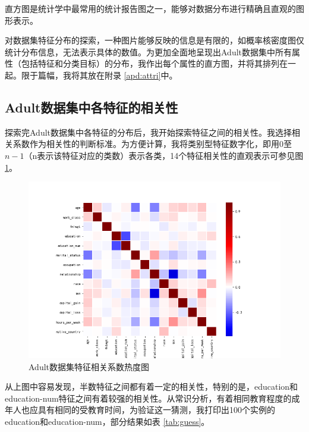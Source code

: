 \documentclass[12pt,a4paper]{article}
\theoremstyle{definition}
\begin{document}
直方图是统计学中最常用的统计报告图之一，能够对数据分布进行精确且直观的图形表示。

\vspace{0.01\linewidth}
对数据集特征分布的探索，一种图片能够反映的信息是有限的，如概率核密度图仅统计分布信息，无法表示具体的数值。为更加全面地呈现出Adult数据集中所有属性（包括特征和分类目标）的分布，我作出每个属性的直方图，并将其排列在一起。限于篇幅，我将其放在附录 \ref{apd:attri}中。

\subsection{Adult数据集中各特征的相关性}
\label{sec:cof}

探索完Adult数据集中各特征的分布后，我开始探索特征之间的相关性。我选择相关系数作为相关性的判断标准。为方便计算，我将类别型特征数字化，即用0至$n-1$（n表示该特征对应的类数）表示各类，14个特征相关性的直观表示可参见图 \ref{fig:heat}。

\begin{figure}[H]
	\centering
	\includegraphics[width=0.85\linewidth]{img/cof_heat.png}
	\caption{Adult数据集特征相关系数热度图}
	\label{fig:heat}
\end{figure}

从上图中容易发现，半数特征之间都有着一定的相关性，特别的是，education和education-num特征之间有着较强的相关性。从常识分析，有着相同教育程度的成年人也应具有相同的受教育时间，为验证这一猜测，我打印出100个实例的education和education-num，部分结果如表 \ref{tab:guess}。
\end{document}
